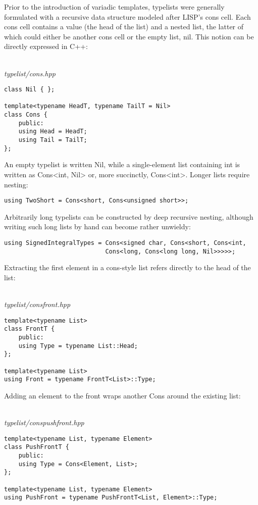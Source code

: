 Prior to the introduction of variadic templates, typelists were generally formulated with a recursive data structure modeled after LISP’s cons cell. Each cons cell contains a value (the head of the list) and a nested list, the latter of which could either be another cons cell or the empty list, nil. This notion can be directly expressed in C++:

\hspace*{\fill} \\ %
\noindent
\textit{typelist/cons.hpp}
\begin{lstlisting}[style=styleCXX]
class Nil { };

template<typename HeadT, typename TailT = Nil>
class Cons {
	public:
	using Head = HeadT;
	using Tail = TailT;
};
\end{lstlisting}

An empty typelist is written Nil, while a single-element list containing int is written as Cons<int, Nil> or, more succinctly, Cons<int>. Longer lists require nesting:

\begin{lstlisting}[style=styleCXX]
using TwoShort = Cons<short, Cons<unsigned short>>;
\end{lstlisting}

Arbitrarily long typelists can be constructed by deep recursive nesting, although writing such long lists by hand can become rather unwieldy:

\begin{lstlisting}[style=styleCXX]
using SignedIntegralTypes = Cons<signed char, Cons<short, Cons<int,
							Cons<long, Cons<long long, Nil>>>>>;
\end{lstlisting}

Extracting the first element in a cons-style list refers directly to the head of the list:

\hspace*{\fill} \\ %
\noindent
\textit{typelist/consfront.hpp}
\begin{lstlisting}[style=styleCXX]
template<typename List>
class FrontT {
	public:
	using Type = typename List::Head;
};

template<typename List>
using Front = typename FrontT<List>::Type;
\end{lstlisting}

Adding an element to the front wraps another Cons around the existing list:

\hspace*{\fill} \\ %
\noindent
\textit{typelist/conspushfront.hpp}
\begin{lstlisting}[style=styleCXX]
template<typename List, typename Element>
class PushFrontT {
	public:
	using Type = Cons<Element, List>;
};

template<typename List, typename Element>
using PushFront = typename PushFrontT<List, Element>::Type;
\end{lstlisting}


